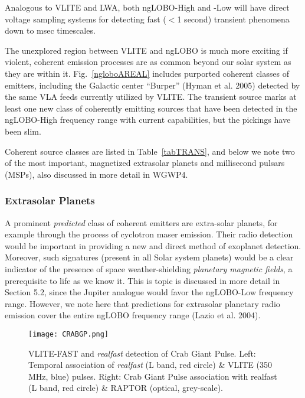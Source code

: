 \documentclass[11pt]{article}
\begin{document}
Analogous to VLITE and LWA, both ngLOBO-High and -Low will have direct voltage sampling systems for detecting  fast ($<$1 second) transient phenomena down to msec timescales.

The unexplored region between VLITE and ngLOBO is much more exciting if violent, coherent emission processes are as common beyond our solar system as they are within it. Fig.~\ref{ngloboAREAL} includes purported coherent classes of emitters, including the Galactic center ``Burper'' (Hyman et al. 2005) detected by the same VLA feeds currently utilized by VLITE. The transient source marks at least one new class of coherently emitting sources that have been detected in the ngLOBO-High frequency range with current capabilities, but the pickings have been slim. 

Coherent source classes are listed in Table~\ref{tabTRANS}, and below we note two of the most important, magnetized extrasolar planets and millisecond pulsars (MSPs), also discussed in more detail in WGWP4. 

\subsubsection {Extrasolar Planets}

A prominent {\it predicted} class of coherent emitters are extra-solar planets, for example through the process of cyclotron maser emission. Their radio detection would be important in providing a new and direct method of exoplanet detection. Moreover, such signatures (present in all Solar system planets) would be a clear indicator of the presence of space weather-shielding {\it planetary magnetic fields}, a prerequisite to life as we know it. This is topic is discussed in more detail in Section 5.2, since the Jupiter analogue would favor the ngLOBO-Low frequency range. However, we note here that predictions for extrasolar planetary radio emission cover the entire ngLOBO frequency range (Lazio et al. 2004).

\begin{figure}[t!]
\begin{center}
\vspace{-1cm}
\texttt{[image: CRABGP.png]}
\end{center}
\vspace{-0.5cm}
\caption{VLITE-FAST and {\it realfast} detection of Crab Giant Pulse. Left: Temporal association of {\it realfast} (L band, red circle) \& VLITE (350 MHz, blue) pulses. Right: Crab Giant Pulse association with realfast (L band, red circle) \& RAPTOR (optical, grey-scale). 
\label{realfast}}
\end{figure}
\end{document}
